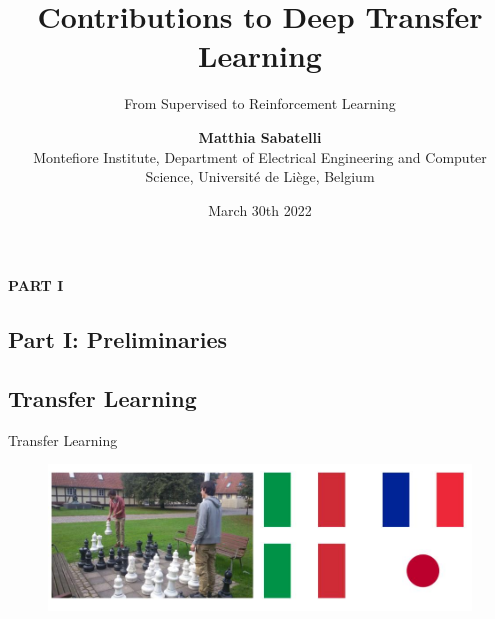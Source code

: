 \documentclass{beamer}
\title{Contributions to Deep Transfer Learning}
\subtitle{From Supervised to Reinforcement Learning}
\author{\textbf{Matthia Sabatelli} \\ Montefiore Institute, Department of Electrical Engineering and Computer Science, Universit\'e de Li\`ege, Belgium}
\date{March 30th 2022}
\begin{document}
\frame{\titlepage} 



\begin{frame}
	\begin{center}
	\textcolor{skymagenta}{\textbf{PART I}}
	\end{center}
\end{frame}


\begin{frame}
	\section{Part I: Preliminaries}
	
	\tableofcontents[sectionstyle=show/hide,subsectionstyle=show/show/hide]
	
	\subsection{Transfer Learning}

\end{frame}

\begin{frame}{Transfer Learning}
	\begin{figure}
		\includegraphics[width=1\textwidth]{figures/example}
	\end{figure}

\end{frame}
\end{document}
